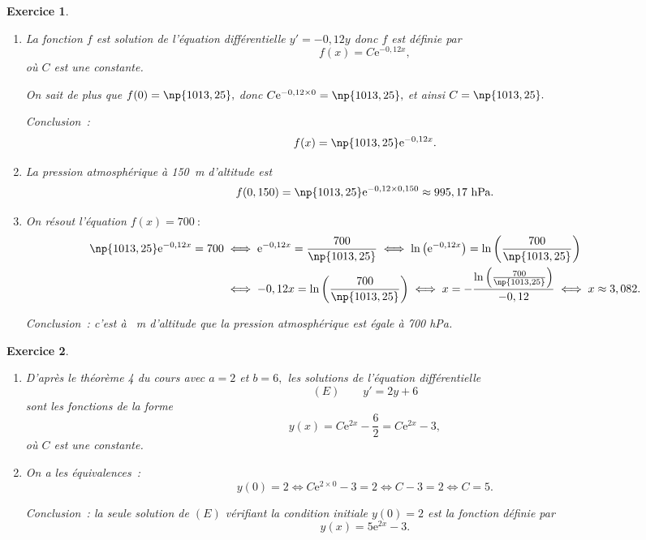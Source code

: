 \documentclass[10pt]{article}
\newtheorem{exo}{Exercice}
\begin{document}
\begin{exo}






\begin{enumerate}
\item La fonction $f$ est solution de l'équation différentielle $y'=-0,12y$ donc $f$ est définie  par
\[f(x)=C\text{e}^{-0,12x},\] où $C$ est une constante.

On sait de plus que $f(0)=\np{1013,25},$ donc $C\text{e}^{-0,12\times 0}=\np{1013,25},$ et ainsi $C=\np{1013,25}.$

Conclusion~: \[f(x)=\np{1013,25}\text{e}^{-0,12x}.\]
\item La pression atmosphérique à 150~m d'altitude est\[f(0,150)=\np{1013,25}\text{e}^{-0,12\times 0,150}\approx 995,17~\text{hPa}.\]
\item On résout l'équation $f(x)=700~:$
\begin{align*}\np{1013,25}\text{e}^{-0,12x}=700 &\iff \text{e}^{-0,12x}=\frac{700}{\np{1013,25}}\iff
\ln\left( \text{e}^{-0,12x}\right)=\ln\left(\frac{700}{\np{1013,25}}\right)\\ &\iff
-0,12x=\ln\left(\frac{700}{\np{1013,25}}\right)\iff x=-\frac{\ln\left(\frac{700}{\np{1013,25}}\right)}{-0,12}\iff x\approx 3,082.
\end{align*}

Conclusion~: c'est à ~m d'altitude que la pression atmosphérique est égale à 700 hPa.
\end{enumerate}

\end{exo}

\begin{exo}

\begin{enumerate}
\item D'après le théorème 4 du cours avec $a=2$ et $b=6,$ les solutions de l'équation différentielle \[(E)\qquad y'=2y+6\] sont les fonctions de la forme
\[y(x)=C\text{e}^{2x}-\frac{6}{2}=C\text{e}^{2x}-3,\] où $C$ est une constante.
\item On a les équivalences~:
\[y(0)=2\iff C\text{e}^{2\times 0}-3=2\iff C-3=2\iff C=5.\]

Conclusion~: la seule solution de $(E)$ vérifiant la condition initiale $y(0)=2$ est la fonction définie par
\[y(x)=5\text{e}^{2x}-3.\]
\end{enumerate}

\end{exo}
\end{document}
